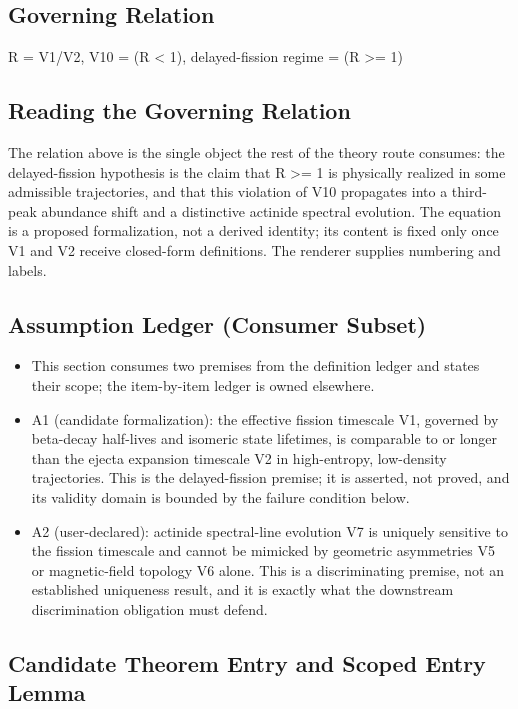 \documentclass[conference]{IEEEtran}
\begin{document}
\subsection{Governing Relation}
R = V1/V2, V10 = (R < 1), delayed-fission regime = (R >= 1)

\subsection{Reading the Governing Relation}
The relation above is the single object the rest of the theory route consumes: the delayed-fission hypothesis is the claim that R >= 1 is physically realized in some admissible trajectories, and that this violation of V10 propagates into a third-peak abundance shift and a distinctive actinide spectral evolution. The equation is a proposed formalization, not a derived identity; its content is fixed only once V1 and V2 receive closed-form definitions. The renderer supplies numbering and labels.

\subsection{Assumption Ledger (Consumer Subset)}
\begin{itemize}
\item This section consumes two premises from the definition ledger and states their scope; the item-by-item ledger is owned elsewhere.
\item A1 (candidate formalization): the effective fission timescale V1, governed by beta-decay half-lives and isomeric state lifetimes, is comparable to or longer than the ejecta expansion timescale V2 in high-entropy, low-density trajectories. This is the delayed-fission premise; it is asserted, not proved, and its validity domain is bounded by the failure condition below.
\item A2 (user-declared): actinide spectral-line evolution V7 is uniquely sensitive to the fission timescale and cannot be mimicked by geometric asymmetries V5 or magnetic-field topology V6 alone. This is a discriminating premise, not an established uniqueness result, and it is exactly what the downstream discrimination obligation must defend.
\end{itemize}

\subsection{Candidate Theorem Entry and Scoped Entry Lemma}
\end{document}
